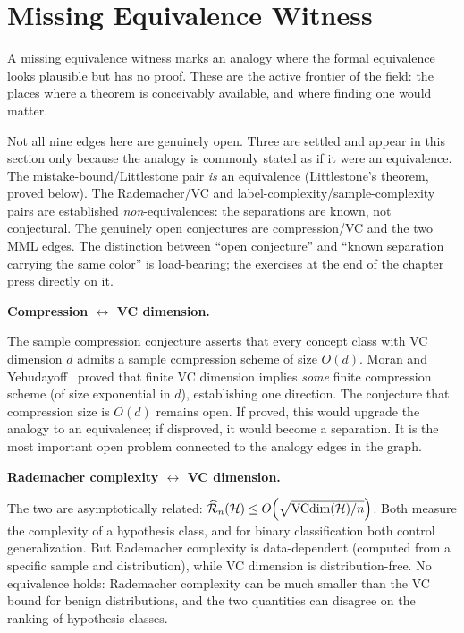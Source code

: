 
\section{Missing Equivalence Witness}
\label{sec:missing-equiv}

A missing equivalence witness marks an analogy where the formal equivalence
looks plausible but has no proof. These are the active frontier of the
field: the places where a theorem is conceivably available, and where
finding one would matter.

Not all nine edges here are genuinely open. Three are settled and appear in
this section only because the analogy is commonly stated as if it were an
equivalence. The mistake-bound/Littlestone pair \emph{is} an equivalence
(Littlestone's theorem, proved below). The Rademacher/VC and
label-complexity/sample-complexity pairs are established
\emph{non}-equivalences: the separations are known, not conjectural.
The genuinely open conjectures are compression/VC and the two MML edges.
The distinction between ``open conjecture'' and ``known separation carrying
the same color'' is load-bearing; the exercises at the end of the chapter
press directly on it.

\begin{obstbox}
\textbf{Compression $\leftrightarrow$ VC dimension.}

\medskip\noindent
The sample compression conjecture asserts that every concept class with
VC dimension $d$ admits a sample compression scheme of size $O(d)$.
Moran and Yehudayoff~\cite{MoranYehudayoff2016} proved that finite VC
dimension implies \emph{some} finite compression scheme (of size
exponential in $d$), establishing one
direction. The conjecture that
compression size is $O(d)$ remains open. If proved, this would upgrade
the analogy to an equivalence; if disproved, it would become a
separation. It is the most important open problem connected to the
analogy edges in the graph.
\end{obstbox}

\begin{obstbox}
\textbf{Rademacher complexity $\leftrightarrow$ VC dimension.}

\medskip\noindent
The two are asymptotically related: $\widehat{\mathcal{R}}_n(\mathcal{H}) \leq
O\!\left(\sqrt{\mathrm{VCdim}(\mathcal{H})/n}\right)$. Both measure the complexity
of a hypothesis class, and for binary classification both control
generalization. But Rademacher complexity is data-dependent
(computed from a specific sample and distribution), while VC dimension is
distribution-free. No equivalence holds: Rademacher complexity can be
much smaller than the VC bound for benign distributions, and the two
quantities can disagree on the ranking of hypothesis classes.
\end{obstbox}

